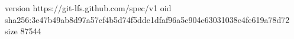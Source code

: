 version https://git-lfs.github.com/spec/v1
oid sha256:3e47b49ab8d97a57cf4b5d74f5dde1dfaf96a5c904e63031038e4fe619a78d72
size 87544
